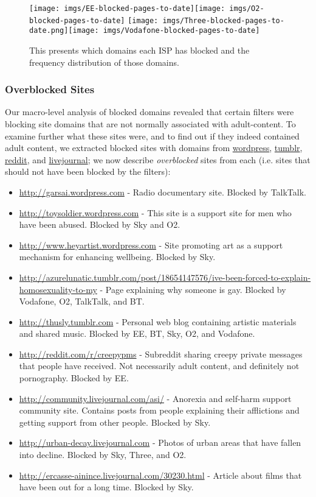 \documentclass{bmcart}
\begin{document}
\begin{figure}[h!]
\caption{ This presents which domains each ISP has blocked and the frequency distribution of those domains.}
\texttt{[image: imgs/EE-blocked-pages-to-date]}\texttt{[image: imgs/O2-blocked-pages-to-date]}
\texttt{[image: imgs/Three-blocked-pages-to-date.png]}\texttt{[image: imgs/Vodafone-blocked-pages-to-date]}
\label{fig:mobile-blocked-domains}
\end{figure}

\subsubsection*{Overblocked Sites}
Our macro-level analysis of blocked domains revealed that certain filters were blocking site domains that are not normally associated with adult-content.
To examine further what these sites were, and to find out if they indeed contained adult content, we extracted blocked sites with domains from \url{wordpress}, \url{tumblr}, \url{reddit}, and \url{livejournal}; we now describe \textit{overblocked} sites from each (i.e. sites that should not have been blocked by the filters):

\begin{itemize}
	\item \url{http://garsai.wordpress.com} - Radio documentary site. Blocked by TalkTalk. 
	\item \url{http://toysoldier.wordpress.com} - This site is a support site for men who have been abused. Blocked by Sky and O2.
	\item \url{http://www.heyartist.wordpress.com} - Site promoting art as a support mechanism for enhancing wellbeing. Blocked by Sky.
	\item \url{http://azurelunatic.tumblr.com/post/18654147576/ive-been-forced-to-explain-homosexuality-to-my} - Page explaining why someone is gay. Blocked by Vodafone, O2, TalkTalk, and BT.
	\item \url{http://thusly.tumblr.com} - Personal web blog containing artistic materials and shared music. Blocked by EE, BT, Sky, O2, and Vodafone.
	\item \url{http://reddit.com/r/creepypms} - Subreddit sharing creepy private messages that people have received. Not necessarily adult content, and definitely not pornography. Blocked by EE.
	\item \url{http://community.livejournal.com/asi/} - Anorexia and self-harm support community site. Contains posts from people explaining their afflictions and getting support from other people. Blocked by Sky.
	\item \url{http://urban-decay.livejournal.com} - Photos of urban areas that have fallen into decline. Blocked by Sky, Three, and O2.
	\item \url{http://ercasse-ainince.livejournal.com/30230.html} - Article about films that have been out for a long time. Blocked by Sky.
\end{itemize}
\end{document}
